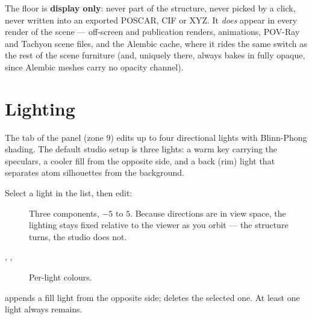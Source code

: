 The floor is \textbf{display only}: never part of the structure, never
picked by a click, never written into an exported POSCAR, CIF or XYZ. It
\emph{does} appear in every render of the scene --- off-screen and
publication renders, animations, POV-Ray and Tachyon scene files, and the
Alembic cache, where it rides the same  switch as the
rest of the scene furniture (and, uniquely there, always bakes in fully
opaque, since Alembic meshes carry no opacity channel).

\section{Lighting}

The  tab of the  panel (zone 9) edits up to
four directional lights with
Blinn-Phong shading. The default studio setup is three lights: a warm key
carrying the speculars, a cooler fill from the opposite side, and a back
(rim) light that separates atom silhouettes from the background.

Select a light in the list, then edit:

\begin{description}
  \item[] Three components, $-5$ to $5$. Because
    directions are in view space, the lighting stays fixed relative to the
    viewer as you orbit --- the structure turns, the studio does not.
  \item[, , ] Per-light colours.
\end{description}

 appends a fill light from the opposite side;  deletes
the selected one. At least one light always remains.
